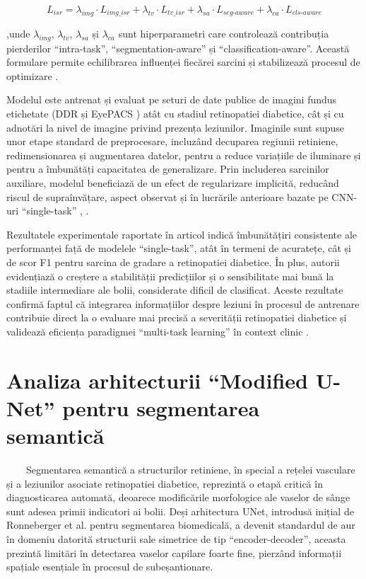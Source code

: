 \documentclass[12pt, a4paper, twoside, romanian]{teza-upb}
\begin{document}
$$L_{isr} = \lambda_{img} \cdot L_{img\_isr} + \lambda_{tv} \cdot L_{tv\_isr} + \lambda_{sa} \cdot
L_{seg\text{-}aware} + \lambda_{ca} \cdot L_{cls\text{-}aware}$$
\bigskip

,unde $\lambda_{img}$, $\lambda_{tv}$, $\lambda_{sa}$ și $\lambda_{ca}$ sunt hiperparametri care controlează 
contribuția pierderilor ``intra-task'', ``segmentation-aware'' și ``classification-aware''. Această formulare permite echilibrarea
influenței fiecărei sarcini și stabilizează procesul de optimizare \cite{6_wang2021deep}.

Modelul este antrenat și evaluat pe seturi de date publice de imagini fundus etichetate (DDR
\cite{15_li2019diagnostic} și EyePACS \cite{9_chetoui2020explainable}) atât cu stadiul retinopatiei diabetice, cât și cu adnotări la nivel de imagine privind
prezența leziunilor. Imaginile sunt supuse unor etape standard de preprocesare, incluzând decuparea
regiunii retiniene, redimensionarea și augmentarea datelor, pentru a reduce variațiile de iluminare și
pentru a îmbunătăți capacitatea de generalizare. Prin includerea sarcinilor auxiliare, modelul beneficiază
de un efect de regularizare implicită, reducând riscul de supraînvățare, aspect observat și în lucrările
anterioare bazate pe CNN-uri “single-task” \cite{3_gulshan2016development}, \cite{4_pratt2016convolutional}.
\bigskip

Rezultatele experimentale raportate în articol indică îmbunătățiri consistente ale performanței
față de modelele “single-task”, atât în termeni de acuratețe, cât și de
scor F1 pentru sarcina de gradare a
retinopatiei diabetice. În plus, autorii evidențiază o creștere a stabilității predicțiilor și o sensibilitate mai
bună la stadiile intermediare ale bolii, considerate dificil de clasificat. Aceste rezultate confirmă faptul că
integrarea informațiilor despre leziuni în procesul de antrenare contribuie direct la o evaluare mai
precisă a severității retinopatiei diabetice și validează eficiența paradigmei “multi-task learning” în
context clinic \cite{6_wang2021deep}.
\bigskip

\section{Analiza arhitecturii “Modified U-Net” pentru segmentarea semantică \cite{12_sambyal2020modified}}

\ \ \ \ Segmentarea semantică a structurilor retiniene, în special a rețelei vasculare și a
leziunilor
asociate retinopatiei diabetice, reprezintă o etapă critică în diagnosticarea automată, deoarece
modificările morfologice ale vaselor de sânge sunt adesea primii indicatori ai bolii.
Deși arhitectura UNet, introdusă inițial de Ronneberger
et al. \cite{5_ronneberger2015u} pentru segmentarea biomedicală, a devenit standardul de
aur în domeniu datorită structurii sale simetrice de tip “encoder-decoder”, aceasta prezintă limitări în
detectarea vaselor capilare foarte fine, pierzând informații spațiale esențiale în procesul de subeșantionare.
\bigskip
\end{document}
